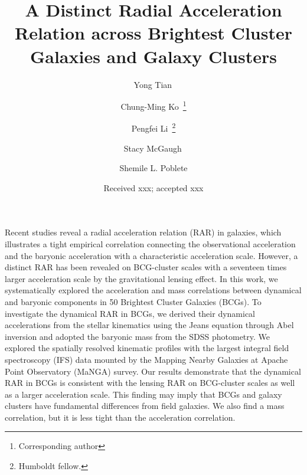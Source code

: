 \documentclass[a4paper, two-column, twocolappendix]{aa}
\begin{document}
\title{A Distinct Radial Acceleration Relation across Brightest Cluster Galaxies and Galaxy Clusters}


\author{Yong Tian\,
        \and
        Chung-Ming Ko\,
        \fnmsep\thanks{Corresponding author}
        \and
        Pengfei Li\,
        \fnmsep\thanks{Humboldt fellow.}
        \and
        Stacy McGaugh\,
        \and
        Shemile L. Poblete
        }


   \date{Received xxx; accepted xxx}

%
%


\abstract
{
Recent studies reveal a radial acceleration relation (RAR) in galaxies, which illustrates a tight empirical correlation connecting the observational acceleration and the baryonic acceleration with a characteristic acceleration scale. However, a distinct RAR has been revealed on BCG-cluster scales with a seventeen times larger acceleration scale by the gravitational lensing effect.
In this work, we systematically explored the acceleration and mass correlations between dynamical and baryonic components in 50 Brightest Cluster Galaxies (BCGs).
To investigate the dynamical RAR in BCGs, we derived their dynamical accelerations from the stellar kinematics using the Jeans equation through Abel inversion and adopted the baryonic mass from the SDSS photometry. We explored the spatially resolved kinematic profiles with the largest integral field spectroscopy (IFS) data mounted by the Mapping Nearby Galaxies at Apache Point Observatory (MaNGA) survey.
Our results demonstrate that the dynamical RAR in BCGs is consistent with the lensing RAR on BCG-cluster scales as well as a larger acceleration scale.
This finding may imply that BCGs and galaxy clusters have fundamental differences from field galaxies. We also find a mass correlation, but it is less tight than the acceleration correlation.
}
\end{document}
